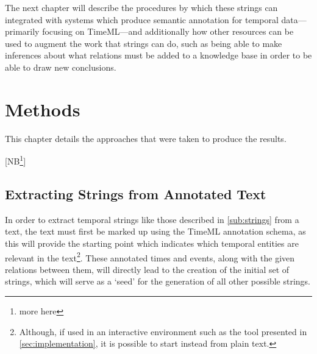 \documentclass[a4paper,12pt,leqno]{article}
\newcommand{\nb}[1]{{\color{red}[NB\footnote{{\color{red}#1}}]}}
\begin{document}
The next chapter will describe the procedures by which these strings can integrated with systems which produce semantic annotation for temporal data---primarily focusing on TimeML---and additionally how other resources can be used to augment the work that strings can do, such as being able to make inferences about what relations must be added to a knowledge base in order to be able to draw new conclusions.

\newpage
\section{Methods}\label{sec:methods}
This chapter details the approaches that were taken to produce the results. 

\nb{more here}

\subsection{Extracting Strings from Annotated Text}\label{sub:extracting}
In order to extract temporal strings like those described in \cref{sub:strings} from a text, the text must first be marked up using the TimeML \citep{timeml2005timeml} annotation schema, as this will provide the starting point which indicates which temporal entities are relevant in the text\footnote{Although, if used in an interactive environment such as the tool presented in \cref{sec:implementation}, it is possible to start instead from plain text.}. These annotated times and events, along with the given relations between them, will directly lead to the creation of the initial set of strings, which will serve as a `seed' for the generation of all other possible strings.
\end{document}
